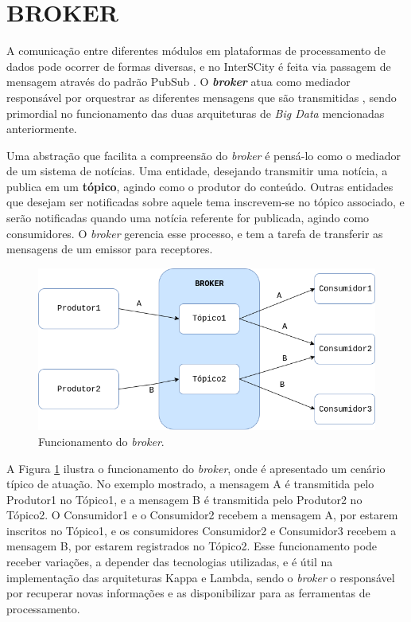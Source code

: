 \section{BROKER}

A comunicação entre diferentes módulos em plataformas de processamento de dados
pode ocorrer de formas diversas, e no InterSCity é feita via passagem de
mensagem através do padrão PubSub \cite{delesposte2017}.
O \textbf{\textit{broker}} atua como mediador responsável por orquestrar as diferentes
mensagens que são transmitidas \cite{marz2015}, sendo primordial no
funcionamento das duas arquiteturas de \textit{Big Data} mencionadas anteriormente.

Uma abstração que facilita a compreensão do \textit{broker} é pensá-lo como o
mediador de um sistema de notícias. Uma entidade, desejando transmitir
uma notícia, a publica em um \textbf{tópico}, agindo como o produtor do
conteúdo. Outras entidades que desejam ser notificadas sobre aquele tema
inscrevem-se no tópico associado, e serão notificadas quando uma notícia referente
for publicada, agindo como consumidores. O \textit{broker} gerencia esse
processo, e tem a tarefa de transferir as mensagens de um emissor para
receptores.

\begin{figure}[hbt]
  \centering
    \includegraphics[scale=0.5]{figuras/broker.png}
    \caption{Funcionamento do \textit{broker}.}
  \label{fig:broker}
\end{figure}

A Figura \ref{fig:broker} ilustra o funcionamento do \textit{broker}, onde é
apresentado um cenário típico de atuação. No exemplo mostrado, a mensagem A
é transmitida pelo Produtor1 no Tópico1, e a mensagem B é transmitida pelo
Produtor2 no Tópico2. O Consumidor1 e o Consumidor2 recebem a mensagem A, por
estarem inscritos no Tópico1, e os consumidores Consumidor2 e Consumidor3
recebem a mensagem B, por estarem registrados no Tópico2. Esse funcionamento
pode receber variações, a depender das tecnologias utilizadas, e é útil
na implementação das arquiteturas Kappa e Lambda, sendo o
\textit{broker} o responsável por recuperar novas informações e as
disponibilizar para as ferramentas de processamento.

